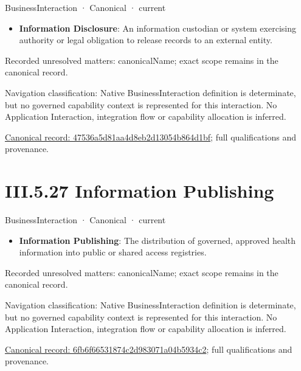 \label{element:47536a5d81aa4d8eb2d13054b864d1bf}
{\small BusinessInteraction · Canonical · current}\par

\begin{itemize}


\item \textbf{Information Disclosure}: An information custodian or system exercising authority or legal obligation to release records to an external entity.

\end{itemize}

{\small Recorded unresolved matters: canonicalName; exact scope remains in the canonical record.}\par
{\small Navigation classification: Native BusinessInteraction definition is determinate, but no governed capability context is represented for this interaction. No Application Interaction, integration flow or capability allocation is inferred.}\par
{\footnotesize \href{../../../../continuum/business/business-interaction/47536a5d81aa4d8eb2d13054b864d1bf.md}{Canonical record: 47536a5d81aa4d8eb2d13054b864d1bf}; full qualifications and provenance.}\par
\section*{III.5.27 Information Publishing}
\label{navigation:III.5.27}

\label{element:6fb6f66531874c2d983071a04b5934c2}
{\small BusinessInteraction · Canonical · current}\par

\begin{itemize}


\item \textbf{Information Publishing}: The distribution of governed, approved health information into public or shared access registries.

\end{itemize}

{\small Recorded unresolved matters: canonicalName; exact scope remains in the canonical record.}\par
{\small Navigation classification: Native BusinessInteraction definition is determinate, but no governed capability context is represented for this interaction. No Application Interaction, integration flow or capability allocation is inferred.}\par
{\footnotesize \href{../../../../continuum/business/business-interaction/6fb6f66531874c2d983071a04b5934c2.md}{Canonical record: 6fb6f66531874c2d983071a04b5934c2}; full qualifications and provenance.}\par
